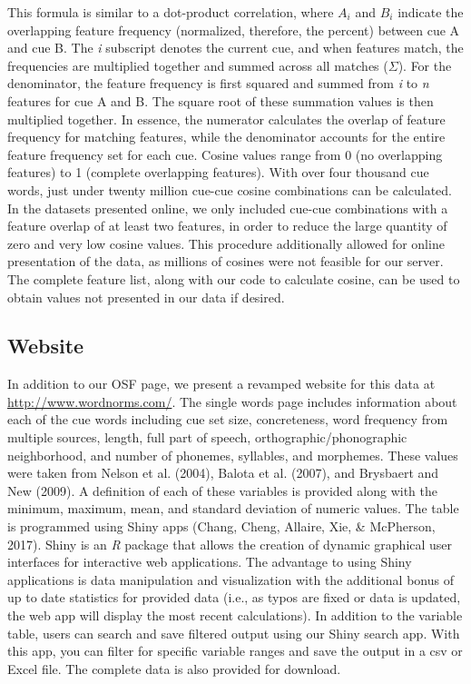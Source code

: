 \documentclass[english,,man]{apa6}
\theoremstyle{definition}
\theoremstyle{definition}
\theoremstyle{definition}
\theoremstyle{remark}
\begin{document}
This formula is similar to a dot-product correlation, where \(A_i\) and
\(B_i\) indicate the overlapping feature frequency (normalized,
therefore, the percent) between cue A and cue B. The \emph{i} subscript
denotes the current cue, and when features match, the frequencies are
multiplied together and summed across all matches (\(\Sigma\)). For the
denominator, the feature frequency is first squared and summed from
\emph{i} to \emph{n} features for cue A and B. The square root of these
summation values is then multiplied together. In essence, the numerator
calculates the overlap of feature frequency for matching features, while
the denominator accounts for the entire feature frequency set for each
cue. Cosine values range from 0 (no overlapping features) to 1 (complete
overlapping features). With over four thousand cue words, just under
twenty million cue-cue cosine combinations can be calculated. In the
datasets presented online, we only included cue-cue combinations with a
feature overlap of at least two features, in order to reduce the large
quantity of zero and very low cosine values. This procedure additionally
allowed for online presentation of the data, as millions of cosines were
not feasible for our server. The complete feature list, along with our
code to calculate cosine, can be used to obtain values not presented in
our data if desired.

\hypertarget{website}{%
\subsection{Website}\label{website}}

In addition to our OSF page, we present a revamped website for this data
at \url{http://www.wordnorms.com/}. The single words page includes
information about each of the cue words including cue set size,
concreteness, word frequency from multiple sources, length, full part of
speech, orthographic/phonographic neighborhood, and number of phonemes,
syllables, and morphemes. These values were taken from Nelson et al.
(2004), Balota et al. (2007), and Brysbaert and New (2009). A definition
of each of these variables is provided along with the minimum, maximum,
mean, and standard deviation of numeric values. The table is programmed
using Shiny apps (Chang, Cheng, Allaire, Xie, \& McPherson, 2017). Shiny
is an \emph{R} package that allows the creation of dynamic graphical
user interfaces for interactive web applications. The advantage to using
Shiny applications is data manipulation and visualization with the
additional bonus of up to date statistics for provided data (i.e., as
typos are fixed or data is updated, the web app will display the most
recent calculations). In addition to the variable table, users can
search and save filtered output using our Shiny search app. With this
app, you can filter for specific variable ranges and save the output in
a csv or Excel file. The complete data is also provided for download.
\end{document}
